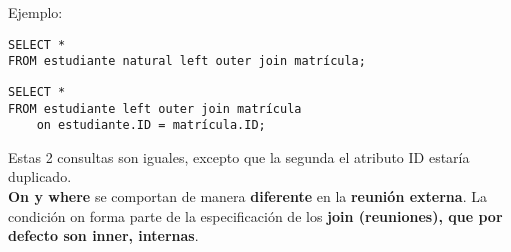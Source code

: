\documentclass{article}
\begin{document}
Ejemplo:
\begin{verbatim}
SELECT *
FROM estudiante natural left outer join matrícula;
\end{verbatim}

\begin{verbatim}
SELECT *
FROM estudiante left outer join matrícula
    on estudiante.ID = matrícula.ID;
\end{verbatim}

Estas 2 consultas son iguales, excepto que la segunda el atributo ID estaría duplicado. \\

\textbf{On y where} se comportan de manera \textbf{diferente} en la \textbf{reunión externa}. La condición on forma parte de la especificación de los \textbf{join (reuniones), que por defecto son inner, internas}.

\begin{comment}
\begin{figure}[h]
    \centering
    \texttt{[image: 1.png]}
    \caption{}
\end{figure}
\end{comment}

\begin{comment}
\begin{wrapfigure}[]{r}{0.5\linewidth}
    \centering
    \texttt{[image: 8.png]}
    \caption{}
\end{wrapfigure}
\end{comment}
\end{document}
